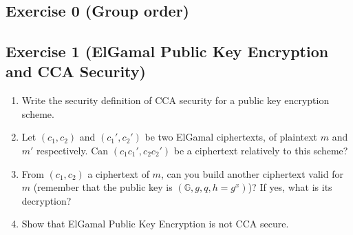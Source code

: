 \section{}
\subsection{Exercise 0 (Group order)}

\subsection{Exercise 1 (ElGamal Public Key Encryption and CCA Security)}
\begin{enumerate}
	\item Write the security definition of CCA security for a public key encryption scheme.
	\item Let $(c_1,c_2)$ and $(c_1',c_2')$ be two ElGamal ciphertexts, of plaintext $m$ and $m'$ respectively. Can $(c_1 c_1',c_2 c_2')$ be a ciphertext relatively to this scheme? 
	\item From $(c_1,c_2)$ a ciphertext of $m$, can you build another ciphertext valid for $m$ (remember that the public key is $(\mathbb{G},g,q,h=g^x)$)? If yes, what is its decryption? 

	\item Show that ElGamal Public Key Encryption is not CCA secure.
\end{enumerate}
